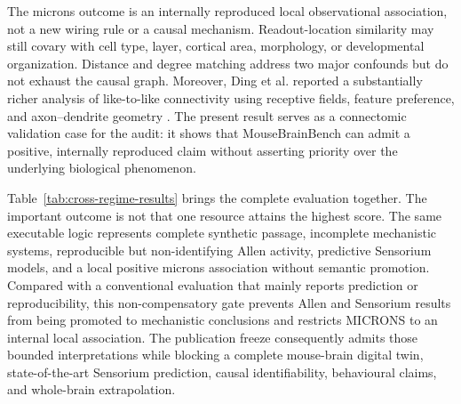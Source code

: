 The \acs{microns} outcome is an internally reproduced local observational association, not a new
wiring rule or a causal mechanism. Readout-location similarity may still covary
with cell type, layer, cortical area, morphology, or developmental organization.
Distance and degree matching address two major confounds but do not exhaust the
causal graph. Moreover, Ding et al. reported a substantially richer analysis of
like-to-like connectivity using receptive fields, feature preference, and
axon--dendrite geometry \citep{ding2025wiring}. The present result serves as a
connectomic validation case for the audit: it shows that MouseBrainBench can admit a
positive, internally reproduced claim without asserting priority over the
underlying biological phenomenon.

Table~\ref{tab:cross-regime-results} brings the complete evaluation together.
The important outcome is not that one resource attains the highest score. The
same executable logic represents complete synthetic passage, incomplete
mechanistic systems, reproducible but non-identifying Allen activity,
predictive Sensorium models, and a local positive \acs{microns} association without
semantic promotion. Compared with a conventional evaluation that mainly reports
prediction or reproducibility, this non-compensatory gate prevents Allen and
Sensorium results from being promoted to mechanistic conclusions and restricts
MICRONS to an internal local association. The publication freeze consequently admits those bounded
interpretations while blocking a complete mouse-brain digital twin,
state-of-the-art Sensorium prediction, causal identifiability, behavioural
claims, and whole-brain extrapolation.

